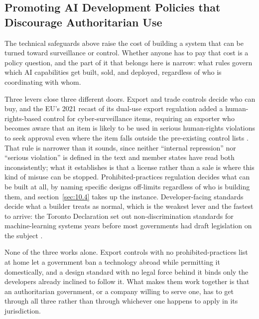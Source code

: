 \subsection{Promoting AI Development Policies that Discourage Authoritarian Use}
\label{sec:6.4.3}
The technical safeguards above raise the cost of building a system that can be turned toward surveillance or control. Whether anyone has to pay that cost is a policy question, and the part of it that belongs here is narrow: what rules govern which AI capabilities get built, sold, and deployed, regardless of who is coordinating with whom.

Three levers close three different doors. Export and trade controls decide who can buy, and the EU's 2021 recast of its dual-use export regulation added a human-rights-based control for cyber-surveillance items, requiring an exporter who becomes aware that an item is likely to be used in serious human-rights violations to seek approval even where the item falls outside the pre-existing control lists \autocite{europeanunion2021regulation}. That rule is narrower than it sounds, since neither “internal repression” nor “serious violation” is defined in the text and member states have read both inconsistently; what it establishes is that a license rather than a sale is where this kind of misuse can be stopped. Prohibited-practices regulation decides what can be built at all, by naming specific designs off-limits regardless of who is building them, and section~\ref{sec:10.4} takes up the instance. Developer-facing standards decide what a builder treats as normal, which is the weakest lever and the fastest to arrive: the Toronto Declaration set out non-discrimination standards for machine-learning systems years before most governments had draft legislation on the subject \autocite{amnestyinternational2018toronto}.

None of the three works alone. Export controls with no prohibited-practices list at home let a government ban a technology abroad while permitting it domestically, and a design standard with no legal force behind it binds only the developers already inclined to follow it. What makes them work together is that an authoritarian government, or a company willing to serve one, has to get through all three rather than through whichever one happens to apply in its jurisdiction.
